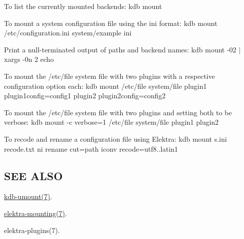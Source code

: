 To list the currently mounted backends\+: {\ttfamily kdb mount}

To mount a system configuration file using the ini format\+: {\ttfamily kdb mount /etc/configuration.ini system/example ini}

Print a null-\/terminated output of paths and backend names\+: {\ttfamily kdb mount -\/02 $\vert$ xargs -\/0n 2 echo}

To mount the /etc/file system file with two plugins with a respective configuration option each\+: {\ttfamily kdb mount /etc/file system/file plugin1 plugin1config=config1 plugin2 plugin2config=config2}

To mount the /etc/file system file with two plugins and setting both to be verbose\+: {\ttfamily kdb mount -\/c verbose=1 /etc/file system/file plugin1 plugin2}

To recode and rename a configuration file using Elektra\+: {\ttfamily kdb mount s.\+ini recode.\+txt ni rename cut=path iconv recode=utf8..latin1}

\subsection*{S\+E\+E A\+L\+S\+O}


\begin{DoxyItemize}
\item \hyperlink{md_doc_help_kdb-umount_doc_help_kdb-umount_md}{kdb-\/umount(7)}.
\item \hyperlink{md_doc_help_elektra-mounting_doc_help_elektra-mounting_md}{elektra-\/mounting(7)}.
\item elektra-\/plugins(7). 
\end{DoxyItemize}